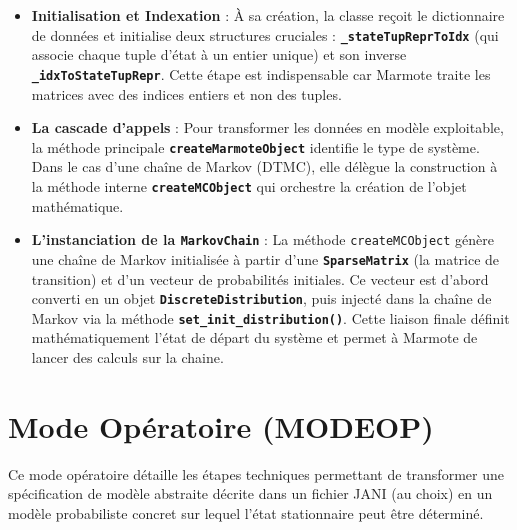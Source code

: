\documentclass[14pt, a4paper]{extarticle}
\begin{document}
\begin{itemize}
    \item \textbf{Initialisation et Indexation} : À sa création, la classe reçoit le dictionnaire de données et initialise deux structures cruciales : \textbf{\texttt{\_stateTupReprToIdx}} (qui associe chaque tuple d'état à un entier unique) et son inverse \textbf{\texttt{\_idxToStateTupRepr}}. Cette étape est indispensable car Marmote traite les matrices avec des indices entiers et non des tuples.
    
    \item \textbf{La cascade d'appels} : Pour transformer les données en modèle exploitable, la méthode principale \textbf{\texttt{createMarmoteObject}} identifie le type de système. Dans le cas d'une chaîne de Markov (DTMC), elle délègue la construction à la méthode interne \textbf{\texttt{createMCObject}} qui orchestre la création de l'objet mathématique.

    \item \textbf{L'instanciation de la \texttt{MarkovChain}} : La méthode \texttt{createMCObject} génère une chaîne de Markov initialisée à partir d'une \textbf{\texttt{SparseMatrix}} (la matrice de transition) et d'un vecteur de probabilités initiales. Ce vecteur est d'abord converti en un objet \textbf{\texttt{DiscreteDistribution}}, puis injecté dans la chaîne de Markov via la méthode \textbf{\texttt{set\_init\_distribution()}}. Cette liaison finale définit mathématiquement l'état de départ du système et permet à Marmote de lancer des calculs sur la chaine.
\end{itemize}

\section{Mode Opératoire (MODEOP)}



\noindent Ce mode opératoire détaille les étapes techniques permettant de transformer une spécification de modèle abstraite décrite dans un fichier JANI (au choix) en un modèle probabiliste concret sur lequel l'état stationnaire peut être déterminé.
\end{document}
